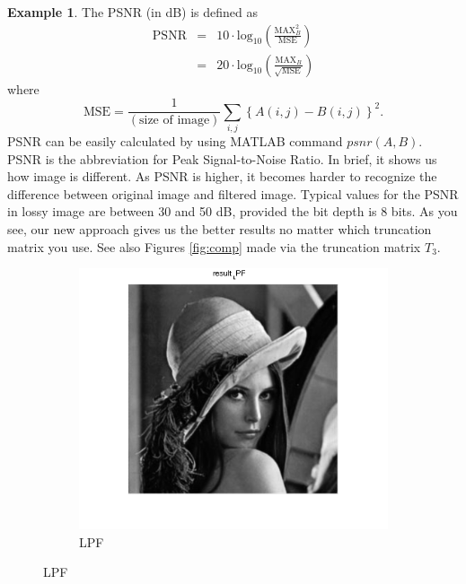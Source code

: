 \documentclass[12pt]{amsart}
\theoremstyle{definition}
\newtheorem{ex}[thm]{Example}
\theoremstyle{remark}
\numberwithin{thm}{section}
\begin{document}
\begin{ex}
The PSNR (in dB) is defined as
\begin{displaymath}
\begin{array}{ccl}
\textrm{PSNR} & = & 10\cdot \textrm{log}_{10} \left( \frac{\textrm{MAX}_B^2}{\textrm{MSE}} \right)\\
		 & = & 20 \cdot \textrm{log}_{10} \left( \frac{\textrm{MAX}_B}{\sqrt{\textrm{MSE}}} \right)
\end{array}
\end{displaymath}
where
\begin{displaymath}
\textrm{MSE} = \frac{1}{(\textrm{size of image})}  \sum_{i,j} \left\{ A(i,j) - B(i,j) \right\}^2.
\end{displaymath}
PSNR can be easily calculated by using MATLAB command $psnr(A,B)$.
PSNR is the abbreviation for Peak Signal-to-Noise Ratio. In brief, it shows us how image is different. As PSNR is higher, it becomes harder to recognize the difference between original image and filtered image. Typical values for the PSNR in lossy image are between 30 and 50 dB, provided the bit depth is 8 bits. 
As you see, our new approach gives us the better results no matter which truncation matrix you use.
See also Figures \ref{fig:comp} made via the truncation matrix $T_3$.
\begin{figure}[h] \centering 
\begin{subfigure}[b]{0.3\textwidth} \includegraphics[width=\textwidth]{LPF.png} \caption{LPF} \label{fig:LPF} \end{subfigure}

\end{figure}
\end{ex}
\end{document}
